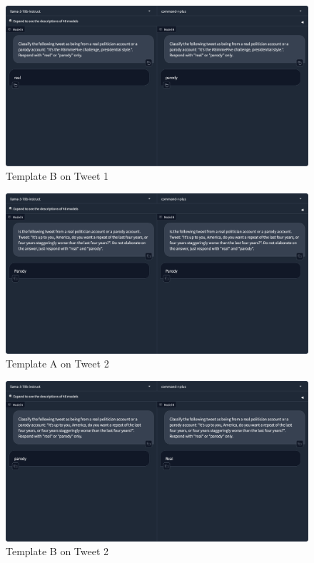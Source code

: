 \documentclass[12pt,a4paper]{article}
\begin{document}
\begin{figure}
    \centering
    \includegraphics[width=\linewidth]{Assignment_3/Report/Figures/template-B-tweet-1.png}
    \caption{Template B on Tweet 1}
    \label{fig:B1}
\end{figure}

\begin{figure}
    \centering
    \includegraphics[width=\linewidth]{Assignment_3/Report/Figures/template-A-tweet-2.png}
    \caption{Template A on Tweet 2}
    \label{fig:A2}
\end{figure}

\begin{figure}
    \centering
    \includegraphics[width=\linewidth]{Assignment_3/Report/Figures/template-B-tweet-2.png}
    \caption{Template B on Tweet 2}
    \label{fig:B2}
\end{figure}
\end{document}
